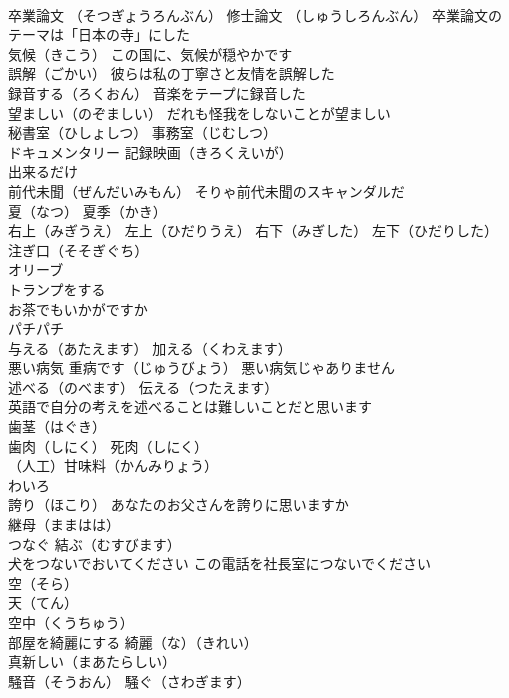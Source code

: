 \documentclass[8pt]{extreport}
\begin{document}
\begin{CJK}{UTF8}{min}
\\	卒業論文 （そつぎょうろんぶん） 修士論文 （しゅうしろんぶん） 卒業論文のテーマは「日本の寺」にした
\\	気候（きこう） この国に、気候が穏やかです
\\	誤解（ごかい） 彼らは私の丁寧さと友情を誤解した
\\	録音する（ろくおん） 音楽をテープに録音した
\\	望ましい（のぞましい） だれも怪我をしないことが望ましい
\\	秘書室（ひしょしつ） 事務室（じむしつ）
\\	ドキュメンタリー 記録映画（きろくえいが）
\\	出来るだけ
\\	前代未聞（ぜんだいみもん） そりゃ前代未聞のスキャンダルだ
\\	夏（なつ） 夏季（かき）
\\	右上（みぎうえ） 左上（ひだりうえ） 右下（みぎした） 左下（ひだりした）
\\	注ぎ口（そそぎぐち）
\\	オリーブ
\\	トランプをする
\\	お茶でもいかがですか
\\	パチパチ
\\	与える（あたえます） 加える（くわえます）
\\	悪い病気 重病です（じゅうびょう） 悪い病気じゃありません
\\	述べる（のべます） 伝える（つたえます）
\\	英語で自分の考えを述べることは難しいことだと思います
\\	歯茎（はぐき）
\\	歯肉（しにく） 死肉（しにく）
\\	（人工）甘味料（かんみりょう） 
\\	わいろ 
\\	誇り（ほこり） あなたのお父さんを誇りに思いますか
\\	継母（ままはは）
\\	つなぐ 結ぶ（むすびます）
\\	犬をつないでおいてください この電話を社長室につないでください
\\	空（そら）
\\	天（てん）
\\	空中（くうちゅう）
\\	部屋を綺麗にする 綺麗（な）（きれい）
\\	真新しい（まあたらしい）
\\	騒音（そうおん） 騒ぐ（さわぎます）

\end{CJK}
\end{document}
